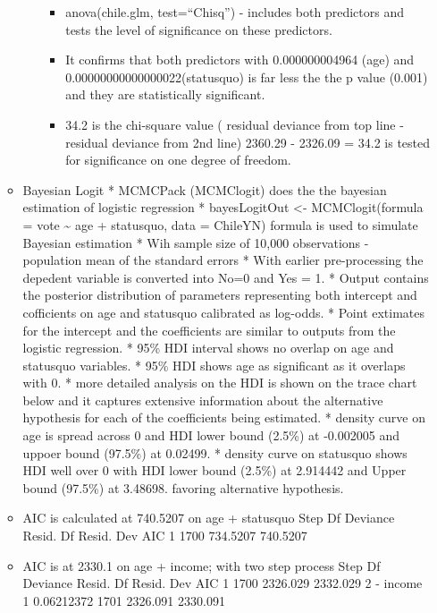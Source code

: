 \documentclass[]{article}
\providecommand{\tightlist}{%
  \setlength{\itemsep}{0pt}\setlength{\parskip}{0pt}}
\begin{document}
\begin{itemize}
\begin{itemize}
\begin{itemize}
      \begin{itemize}
      \tightlist
      \item
        anova(chile.glm, test=``Chisq'') - includes both predictors and
        tests the level of significance on these predictors.
      \item
        It confirms that both predictors with 0.000000004964 (age) and
        0.00000000000000022(statusquo) is far less the the p value
        (0.001) and they are statistically significant.
      \item
        34.2 is the chi-square value ( residual deviance from top line -
        residual deviance from 2nd line) 2360.29 - 2326.09 = 34.2 is
        tested for significance on one degree of freedom.
      \end{itemize}
    \end{itemize}
  \item
    Bayesian Logit * MCMCPack (MCMClogit) does the the bayesian
    estimation of logistic regression * bayesLogitOut \textless{}-
    MCMClogit(formula = vote \textasciitilde{} age + statusquo, data =
    ChileYN) formula is used to simulate Bayesian estimation * Wih
    sample size of 10,000 observations - population mean of the standard
    errors * With earlier pre-processing the depedent variable is
    converted into No=0 and Yes = 1. * Output contains the posterior
    distribution of parameters representing both intercept and
    cofficients on age and statusquo calibrated as log-odds. * Point
    extimates for the intercept and the coefficients are similar to
    outputs from the logistic regression. * 95\% HDI interval shows no
    overlap on age and statusquo variables. * 95\% HDI shows age as
    significant as it overlaps with 0. * more detailed analysis on the
    HDI is shown on the trace chart below and it captures extensive
    information about the alternative hypothesis for each of the
    coefficients being estimated. * density curve on age is spread
    across 0 and HDI lower bound (2.5\%) at -0.002005 and uppoer bound
    (97.5\%) at 0.02499. * density curve on statusquo shows HDI well
    over 0 with HDI lower bound (2.5\%) at 2.914442 and Upper bound
    (97.5\%) at 3.48698. favoring alternative hypothesis.
  \item
    AIC is calculated at 740.5207 on age + statusquo Step Df Deviance
    Resid. Df Resid. Dev AIC 1 1700 734.5207 740.5207
  \item
    AIC is at 2330.1 on age + income; with two step process Step Df
    Deviance Resid. Df Resid. Dev AIC 1 1700 2326.029 2332.029 2 -
    income 1 0.06212372 1701 2326.091 2330.091
  \end{itemize}
\end{itemize}
\end{document}
